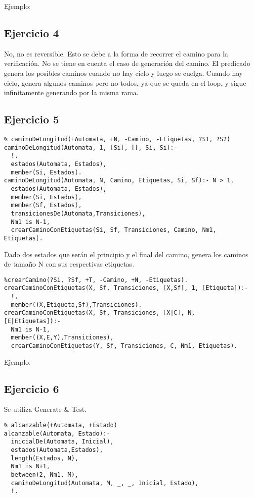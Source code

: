 \documentclass[10pt, a4paper,english,spanish,hidelinks]{article}
\begin{document}
Ejemplo:

\subsection{Ejercicio 4}

No, no es reversible. 
Esto se debe a la forma de recorrer el camino para la verificación. No se tiene
en cuenta el caso de generación del camino.
El predicado genera los posibles caminos cuando no hay ciclo y luego se cuelga.
Cuando hay ciclo, genera algunos caminos pero no todos, ya que se queda en el loop,
y sigue infinitamente generando por la misma rama.


\subsection{Ejercicio 5}

\begin{verbatim}
% caminoDeLongitud(+Automata, +N, -Camino, -Etiquetas, ?S1, ?S2)
caminoDeLongitud(Automata, 1, [Si], [], Si, Si):-
  !,
  estados(Automata, Estados),
  member(Si, Estados).
caminoDeLongitud(Automata, N, Camino, Etiquetas, Si, Sf):- N > 1,
  estados(Automata, Estados),
  member(Si, Estados),
  member(Sf, Estados),
  transicionesDe(Automata,Transiciones),
  Nm1 is N-1,
  crearCaminoConEtiquetas(Si, Sf, Transiciones, Camino, Nm1, Etiquetas).
\end{verbatim}


Dado dos estados que serán el principio y el final del camino, genera los caminos de
tamaño N con sus respectivas etiquetas. 

\begin{verbatim}
%crearCamino(?Si, ?Sf, +T, -Camino, +N, -Etiquetas).
crearCaminoConEtiquetas(X, Sf, Transiciones, [X,Sf], 1, [Etiqueta]):-
  !,
  member((X,Etiqueta,Sf),Transiciones).
crearCaminoConEtiquetas(X, Sf, Transiciones, [X|C], N, [E|Etiquetas]):-
  Nm1 is N-1,
  member((X,E,Y),Transiciones),
  crearCaminoConEtiquetas(Y, Sf, Transiciones, C, Nm1, Etiquetas).
\end{verbatim}

Ejemplo:

\subsection{Ejercicio 6}
Se utiliza Generate & Test.
\begin{verbatim}
% alcanzable(+Automata, +Estado)
alcanzable(Automata, Estado):-
  inicialDe(Automata, Inicial),
  estados(Automata,Estados),
  length(Estados, N),
  Nm1 is N+1,
  between(2, Nm1, M),
  caminoDeLongitud(Automata, M, _, _, Inicial, Estado),
  !.
\end{verbatim}
\end{document}
